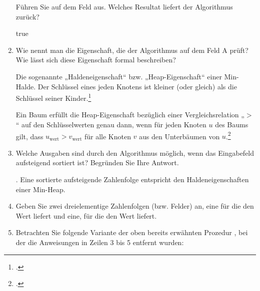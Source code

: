 \documentclass{lehramt-informatik-aufgabe}
\begin{document}
\begin{enumerate}
Führen Sie  auf dem Feld aus. Welches Resultat liefert der
Algorithmus zurück?

\begin{liAntwort}
true
\end{liAntwort}


\item Wie nennt man die Eigenschaft, die der Algorithmus  auf
dem Feld A prüft? Wie lässt sich diese Eigenschaft formal beschreiben?

\begin{liAntwort}
Die sogenannte „Haldeneigenschaft“ bzw. „Heap-Eigenschaft“ einer
Min-Halde. Der Schlüssel eines jeden Knotens ist kleiner (oder gleich)
als die Schlüssel seiner Kinder.\footcite[Seite 407]{saake}

Ein Baum erfüllt die Heap-Eigenschaft bezüglich einer Vergleichsrelation
„$>$“ auf den Schlüsselwerten genau dann, wenn für jeden Knoten $u$ des
Baums gilt, dass $u_\text{wert} > v_\text{wert}$ für alle Knoten $v$ aus
den Unterbäumen von $u$.\footcite[Seite 259]{weicker}
\end{liAntwort}


\item Welche Ausgaben sind durch den Algorithmus  möglich, wenn
das Eingabefeld aufsteigend sortiert ist? Begründen Sie Ihre Antwort.

\begin{liAntwort}
. Eine sortierte aufsteigende Zahlenfolge entspricht den
Haldeneigenschaften einer Min-Heap.
\end{liAntwort}


\item Geben Sie zwei dreielementige Zahlenfolgen (bzw. Felder) an, eine
für die  den Wert  liefert und eine, für die
 den Wert  liefert.

\begin{liAntwort}
\end{liAntwort}


\item Betrachten Sie folgende Variante  der oben bereits
erwähnten Prozedur , bei der die Anweisungen in Zeilen 3 bis 5
entfernt wurden:


\end{enumerate}
\end{document}
